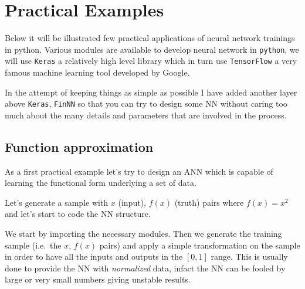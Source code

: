 \section{Practical Examples}\label{practical-examples}

Below it will be illustrated few practical applications of neural
network trainings in python. Various modules are available to develop
neural network in \texttt{python}, we will use \texttt{Keras} a
relatively high level library which in turn use \texttt{TensorFlow} a
very famous machine learning tool developed by Google.

In the attempt of keeping things as simple as possible I have added
another layer above \texttt{Keras}, \texttt{FinNN} so that you can try
to design some NN without caring too much about the many details and
parameters that are involved in the process.

\subsection{Function approximation}\label{function-approximation}

As a first practical example let's try to design an ANN which is capable
of learning the functional form underlying a set of data.

Let's generate a sample with \(x\) (input), \(f(x)\) (truth) pairs where
\(f(x) = x^2\) and let's start to code the NN structure.

We start by importing the necessary modules. Then we generate the
training sample (i.e.~the \(x\), \(f(x)\) pairs) and apply a simple
transformation on the sample in order to have all the inputs and outputs
in the \([0, 1]\) range. This is usually done to provide the NN with
\emph{normalized} data, infact the NN can be fooled by large or very
small numbers giving unstable results.

